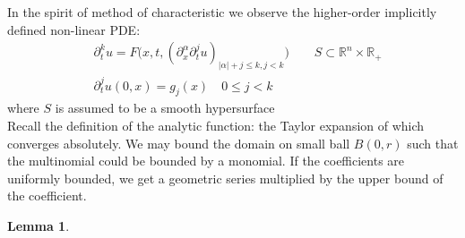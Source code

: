 \documentclass[a4paper,11pt,oneside,fleqn]{book}
\newtheorem{lemma}[theorem]{Lemma}
\theoremstyle{definition}
\theoremstyle{remark}
\begin{document}
In the spirit of method of characteristic we observe the higher-order implicitly defined non-linear PDE:
\begin{align*}
	& \partial_t^k u =  F\bigg(x, t, (\partial_x^\alpha \partial_t^j u)_{ |\alpha| + j \le k, j < k } \bigg) \qquad S \subset \mathbb{R}^n \times \mathbb{R}_+ \\
	& \partial_t^j  u (0, x) = g_j(x)   \quad 0 \le j < k
\end{align*}
where $S$ is assumed to be a smooth hypersurface \\
Recall the definition of the analytic function: the Taylor expansion of which converges absolutely. We may bound the domain on small ball $B(0, r)$ such that the multinomial could be bounded by a monomial. If the coefficients are uniformly bounded, we get a geometric series multiplied by the upper bound of the coefficient. 

\begin{lemma}
\end{lemma}
\end{document}
